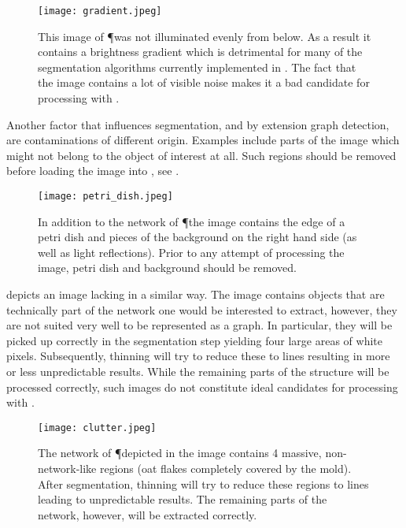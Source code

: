 	\begin{figure}
		\centering
		\texttt{[image: gradient.jpeg]}
		\caption[\NEFIs caveats - Gradients]{This image of \P was not illuminated evenly from below. As a result it contains a brightness gradient which is detrimental for many of the segmentation algorithms currently implemented in \NEFI. The fact that the image contains a lot of visible noise makes it a bad candidate for processing with \NEFI.}
		\label{fig:sup:gradient}
	\end{figure}

	Another factor that influences segmentation, and by extension graph detection, are contaminations of different origin. Examples include parts of the image which might not belong to the object of interest at all. Such regions should be removed before loading the image into \NEFI, see . 

	\begin{figure}
		\centering
		\texttt{[image: petri\_dish.jpeg]}
		\caption[\NEFIs caveats - Non-network objects]{In addition to the network of \P the image contains the edge of a petri dish and pieces of the background on the right hand side (as well as light reflections). Prior to any attempt of processing the image, petri dish and background should be removed.}
		\label{fig:sup:petri_dish}
	\end{figure}

	 depicts an image lacking in a similar way. The image contains objects that are technically part of the network one would be interested to extract, however, they are not suited very well to be represented as a graph. In particular, they will be picked up correctly in the segmentation step yielding four large areas of white pixels. Subsequently, thinning will try to reduce these to lines resulting in more or less unpredictable results. While the remaining parts of the structure will be processed correctly, such images do not constitute ideal candidates for processing with \NEFI.

	\begin{figure}
		\centering
		\texttt{[image: clutter.jpeg]}
		\caption[\NEFIs caveats - Non-network objects]{The network of \P depicted in the image contains 4 massive, non-network-like regions (oat flakes completely covered by the mold). After segmentation, thinning will try to reduce these regions to lines leading to unpredictable results. The remaining parts of the network, however, will be extracted correctly.}
		\label{fig:sup:clutter}
	\end{figure}

